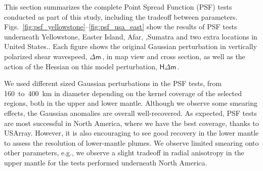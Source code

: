 \documentclass[extra,mreferee]{gji}
\begin{document}
This section summarizes the complete Point Spread Function (PSF) tests conducted as part of this study, including the tradeoff between parameters.
Figs.~\ref{fig:psf_yellowstone}--\ref{fig:psf_usa_east} show the results of PSF tests underneath Yellowstone, Easter Island, Afar, ,Sumatra and two extra locations in United States..
Each figure shows the original Gaussian perturbation in vertically polarized shear wavespeed, $\mathsf{\Delta}\mathsf{m}$\,, in map view and cross section, as well as the action of the Hessian on this model perturbation, $\mathsf{H}\mathsf{\Delta}\mathsf{m}$\,.

We used different sized Gaussian perturbations in the PSF tests, from 160~to~400~km in diameter depending on the kernel coverage of the selected regions, both in the upper and lower mantle. Although we observe some smearing effects, the Gaussian anomalies are overall well-recovered. As expected, PSF tests are most successful in North America, where we have the best coverage, thanks to USArray. However, it is also encouraging to see good recovery in the lower mantle to assess the resolution of lower-mantle plumes. We observe limited smearing onto other parameters, e.g., we observe a slight tradeoff in radial anisotropy in the upper mantle for the tests performed underneath North America.
\end{document}
